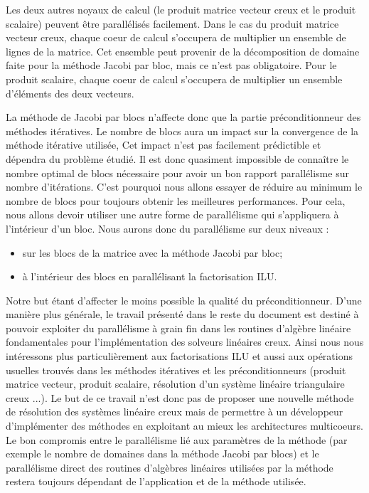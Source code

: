 Les deux autres noyaux de calcul (le produit matrice vecteur creux et le produit scalaire) peuvent être parallélisés facilement.
%
Dans le cas du produit matrice vecteur creux, chaque coeur de calcul s'occupera de multiplier un ensemble de lignes de la matrice.
%
Cet ensemble peut provenir de la décomposition de domaine faite pour la méthode Jacobi par bloc, mais ce n'est pas obligatoire.
%
Pour le produit scalaire, chaque coeur de calcul s'occupera de multiplier un ensemble d'éléments des deux vecteurs.


La méthode de Jacobi par blocs n'affecte donc que la partie préconditionneur des méthodes itératives.
%
Le nombre de blocs aura un impact sur la convergence de la méthode itérative utilisée,
%
Cet impact n'est pas facilement prédictible et dépendra du problème étudié.
%
Il est donc quasiment impossible de connaître le nombre optimal de blocs nécessaire pour avoir un bon rapport parallélisme sur nombre d'itérations.
%
C'est pourquoi nous allons essayer de réduire au minimum le nombre de blocs pour toujours obtenir les meilleures performances.
%
Pour cela, nous allons devoir utiliser une autre forme de parallélisme qui s'appliquera à l'intérieur d'un bloc.
%
Nous aurons donc du parallélisme sur deux niveaux :
\begin{itemize}
  \item sur les blocs de la matrice avec la méthode Jacobi par bloc;
  \item à l'intérieur des blocs en parallélisant la factorisation ILU.
\end{itemize}
%
Notre but étant d'affecter le moins possible la qualité du préconditionneur.
%
D'une manière plus générale, le travail présenté dans le reste du document est destiné à pouvoir exploiter du parallélisme à grain fin dans les routines d'algèbre linéaire fondamentales pour l'implémentation des solveurs linéaires creux.
%
Ainsi nous nous intéressons plus particulièrement aux factorisations ILU et aussi aux opérations usuelles trouvés dans les méthodes itératives et les préconditionneurs (produit matrice vecteur, produit scalaire, résolution d'un système linéaire triangulaire creux ...).
%
Le but de ce travail n'est donc pas de proposer une nouvelle méthode de résolution des systèmes linéaire creux mais de permettre à un développeur d'implémenter des méthodes en exploitant au mieux les architectures multicoeurs.
%
Le bon compromis entre le parallélisme lié aux paramètres de la méthode (par exemple le nombre de domaines dans la méthode Jacobi par blocs) et le parallélisme direct des routines d'algèbres linéaires utilisées par la méthode restera toujours dépendant de l'application et de la méthode utilisée.
